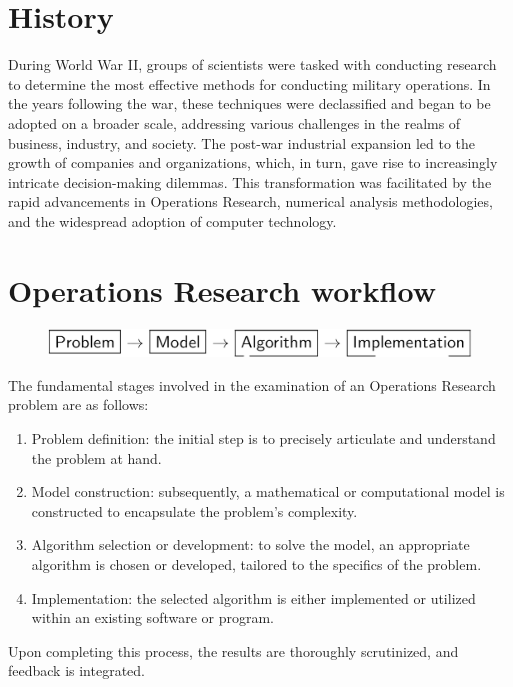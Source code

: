 \documentclass[12pt, a4paper]{report}
\begin{document}
    \section{History}
    During World War II, groups of scientists were tasked with conducting research to determine the most effective methods for conducting military operations. 
    In the years following the war, these techniques were declassified and began to be adopted on a broader scale, addressing various challenges in the realms of business, industry, and society. 
    The post-war industrial expansion led to the growth of companies and organizations, which, in turn, gave rise to increasingly intricate decision-making dilemmas. 
    This transformation was facilitated by the rapid advancements in Operations Research, numerical analysis methodologies, and the widespread adoption of computer technology.

    \section{Operations Research workflow}
    \begin{figure}[H]
        \centering
        \includegraphics[width=1\linewidth]{images/study.png}
    \end{figure}
    The fundamental stages involved in the examination of an Operations Research problem are as follows:
    \begin{enumerate}
        \item Problem definition: the initial step is to precisely articulate and understand the problem at hand.
        \item Model construction: subsequently, a mathematical or computational model is constructed to encapsulate the problem's complexity.
        \item Algorithm selection or development: to solve the model, an appropriate algorithm is chosen or developed, tailored to the specifics of the problem.
        \item Implementation: the selected algorithm is either implemented or utilized within an existing software or program.
    \end{enumerate}
    Upon completing this process, the results are thoroughly scrutinized, and feedback is integrated.
\end{document}
